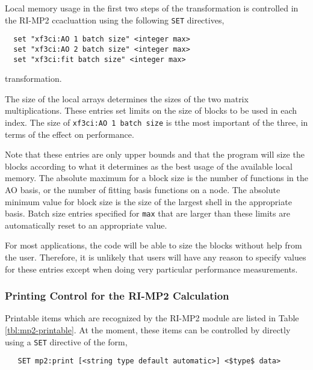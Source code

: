 Local memory usage in the first two steps of the transformation is
controlled in the RI-MP2 ccacluattion using the following \verb+SET+
directives,

\begin{verbatim}
  set "xf3ci:AO 1 batch size" <integer max>
  set "xf3ci:AO 2 batch size" <integer max>
  set "xf3ci:fit batch size" <integer max>
\end{verbatim}

transformation.  

The size of the local arrays determines the sizes of
the two matrix multiplications.  These entries set limits on the size
of blocks to be used in each index.  The size of \verb+xf3ci:AO 1 batch size+
is tthe most important of the three, in terms of the effect on performance.


Note that these entries are only upper bounds and that the program
will size the blocks according to what it determines as the best usage of
the available local memory.  The absolute maximum for a block size is
the number of functions in the AO basis, or the number of fitting basis
functions on a node.  The absolute minimum value for block size is the 
size of the largest shell in the appropriate basis.  Batch size entries 
specified for \verb+max+  that are larger than these limits are 
automatically reset to an appropriate value.

For most applications, the code will be able to size the blocks without
help from the user.  Therefore, it is unlikely that users will have 
any reason to specify values for these entries
except when doing very particular performance measurements.

\subsubsection{Printing Control for the RI-MP2 Calculation}

Printable items which are recognized by the RI-MP2 module are listed
in Table \ref{tbl:mp2-printable}.  At the moment, these items can be
controlled by directly using a \verb+SET+ directive of the form,

\begin{verbatim}
   SET mp2:print [<string type default automatic>] <$type$ data>
\end{verbatim}

